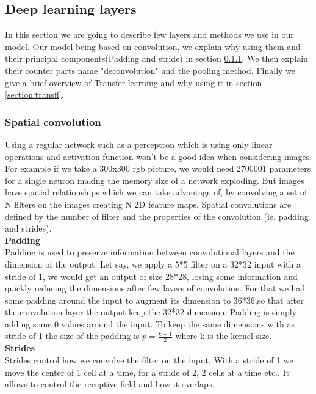 \subsection{Deep learning layers}\label{Deep learning}

In this section we are going to describe few layers and methods we use in our model. Our model being based on convolution, we explain why using them and their principal components(Padding and stride) in section \ref{section:conv}. We then explain their counter parts name "deconvolution" and the pooling method. Finally we give a brief overview of Transfer learning and why using it in section \ref{section:transfl}.


\subsubsection{Spatial convolution}\label{section:conv}

Using a regular network such as a perceptron which is using only linear operations and activation function won't be a good idea when considering images. For example if we take a 300x300 rgb picture, we would need 2700001 parameters for a single neuron making the memory size of a network exploding. But images have spatial relationships which we can take advantage of, by convolving a set of N filters on the images creating  N 2D feature maps. Spatial convolutions are defined by the number of filter and the properties of the convolution (ie. padding and strides). \\

\textbf{Padding}\\

Padding is used to preserve information between convolutional layers and  the dimension of the output. Let say, we apply a 5*5 filter on a 32*32 input with a stride of 1, we would get an output of size 28*28, losing some information and quickly reducing the dimensions after few layers of convolution. For that we had some padding around the input to augment its dimension to 36*36,so that after the convolution layer the output keep the 32*32 dimension. Padding is simply adding some 0 values around the input. To keep the same dimensions with as stride of 1 the size of the padding is $p = \frac{k-1}{2}$ where k is the kernel size.\\

\textbf{Strides}\\

Strides control how we convolve the filter on the input. With a stride of 1 we move the center of 1 cell at a time, for a stride of 2, 2 cells at a time etc.. It allows to control the receptive field and how it overlaps.\\

